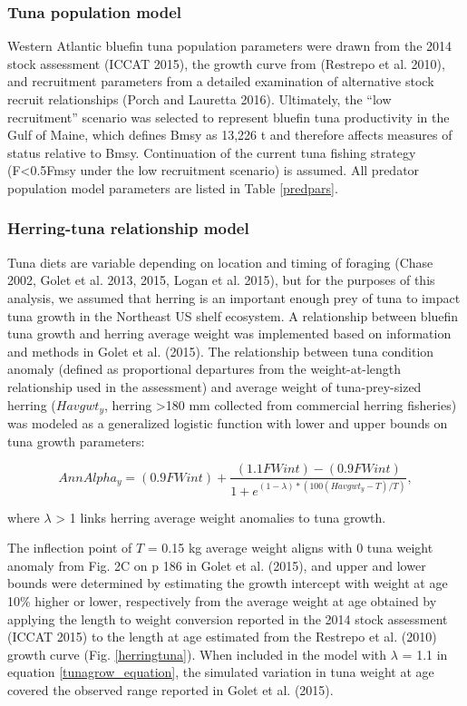 \documentclass[]{article}
\begin{document}
\subsubsection{Tuna population model}\label{tuna-population-model}

Western Atlantic bluefin tuna population parameters were drawn from the
2014 stock assessment (ICCAT 2015), the growth curve from (Restrepo et
al. 2010), and recruitment parameters from a detailed examination of
alternative stock recruit relationships (Porch and Lauretta 2016).
Ultimately, the ``low recruitment'' scenario was selected to represent
bluefin tuna productivity in the Gulf of Maine, which defines Bmsy as
13,226 t and therefore affects measures of status relative to Bmsy.
Continuation of the current tuna fishing strategy (F\textless{}0.5Fmsy
under the low recruitment scenario) is assumed. All predator population
model parameters are listed in Table \ref{predpars}.

\subsubsection{Herring-tuna relationship
model}\label{herring-tuna-relationship-model}

Tuna diets are variable depending on location and timing of foraging
(Chase 2002, Golet et al. 2013, 2015, Logan et al. 2015), but for the
purposes of this analysis, we assumed that herring is an important
enough prey of tuna to impact tuna growth in the Northeast US shelf
ecosystem. A relationship between bluefin tuna growth and herring
average weight was implemented based on information and methods in Golet
et al. (2015). The relationship between tuna condition anomaly (defined
as proportional departures from the weight-at-length relationship used
in the assessment) and average weight of tuna-prey-sized herring
(\(Havgwt_{y}\), herring \textgreater{}180 mm collected from commercial
herring fisheries) was modeled as a generalized logistic function with
lower and upper bounds on tuna growth parameters:

\begin{equation}
AnnAlpha_{y} = (0.9 FWint) + \frac{(1.1 FWint) - (0.9 FWint)}{1+e^{(1-\lambda)*(100(Havgwt_{y}-T)/T)}} \label{tunagrow_equation},
\end{equation}

where \(\lambda\) \textgreater{} 1 links herring average weight
anomalies to tuna growth.

The inflection point of \(T\) = 0.15 kg average weight aligns with 0
tuna weight anomaly from Fig. 2C on p 186 in Golet et al. (2015), and
upper and lower bounds were determined by estimating the growth
intercept with weight at age 10\% higher or lower, respectively from the
average weight at age obtained by applying the length to weight
conversion reported in the 2014 stock assessment (ICCAT 2015) to the
length at age estimated from the Restrepo et al. (2010) growth curve
(Fig. \ref{herringtuna}). When included in the model with \(\lambda\) =
1.1 in equation \ref{tunagrow_equation}, the simulated variation in tuna
weight at age covered the observed range reported in Golet et al.
(2015).
\end{document}
